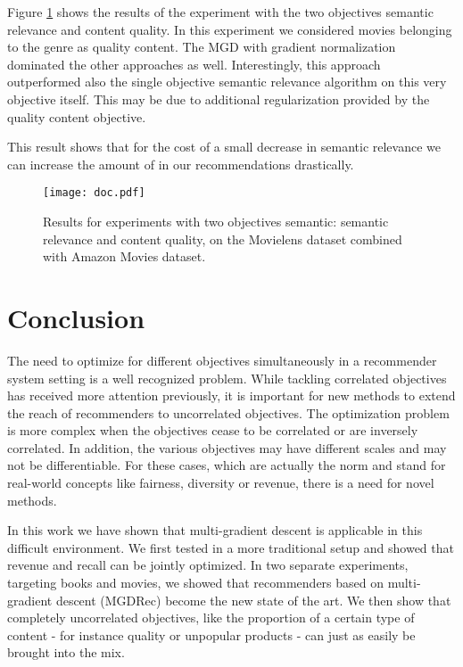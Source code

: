 \documentclass[letterpaper]{article}
\begin{document}
Figure \ref{fig:res-documentaries} shows the results of the experiment with the two objectives semantic relevance and content quality. In this experiment we considered movies belonging to the genre  as quality content. The MGD with gradient normalization dominated the other approaches as well. Interestingly, this approach outperformed also the single objective semantic relevance algorithm on this very objective itself. This may be due to additional regularization provided by the quality content objective.

This result shows that for the cost of a small decrease in semantic relevance we can increase the amount of  in our recommendations drastically.

\begin{figure}[!h]
    \centering
    \texttt{[image: doc.pdf]}
    \caption{\label{fig:res-documentaries}Results for experiments with two objectives semantic: semantic relevance and content quality, on the Movielens dataset combined with Amazon Movies dataset.}
\end{figure}

\section{Conclusion}

The need to optimize for different objectives simultaneously in a recommender system setting is a well recognized problem. While tackling correlated objectives has received more attention previously, it is important for new methods to extend the reach of recommenders to uncorrelated objectives. 
The optimization problem is more complex when the objectives cease to be correlated or are inversely correlated.
In addition, the various objectives may have different scales and may not be differentiable. For these cases, which are actually the norm and stand for real-world concepts like fairness, diversity or revenue, there is a need for novel methods.

In this work we have shown that multi-gradient descent is applicable in this difficult environment. We first tested in a more traditional setup and showed that revenue and recall can be jointly optimized. In two separate experiments, targeting books and movies, we showed that recommenders based on multi-gradient descent (MGDRec) become the new state of the art. 
We then show that completely uncorrelated objectives, like the proportion of a certain type of content - for instance quality or unpopular products - can just as easily be brought into the mix.
\end{document}
